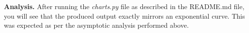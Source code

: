 \documentclass{article}
\begin{document}
\hfill

\textbf{Analysis.} After running the \emph{charts.py} file as described in the README.md file, you will see that the produced output exactly mirrors an exponential curve. This was expected as per the asymptotic analysis performed above. 

\newpage
 

\end{document}

